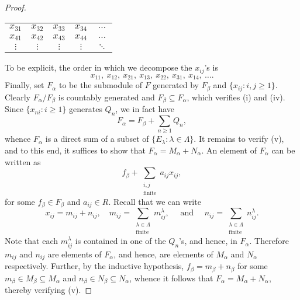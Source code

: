 \begin{proof}
\begin{center}
\begin{tabular}{ccccc}
            $x_{31}$ & $x_{32}$ & $x_{33}$ & $x_{34}$ & $\dots$\\
            $x_{41}$ & $x_{42}$ & $x_{43}$ & $x_{44}$ & $\dots$\\
            $\vdots$ & $\vdots$ & $\vdots$ & $\vdots$ & $\ddots$
        \end{tabular}
    \end{center}
    To be explicit, the order in which we decompose the $x_{ij}$'s is 
    \begin{equation*}
        x_{11},~ x_{12},~ x_{21},~ x_{13},~ x_{22},~ x_{31},~ x_{14},~\dots.
    \end{equation*}
    Finally, set $F_{\alpha}$ to be the submodule of $F$ generated by $F_\beta$ and $\{x_{ij}\colon i,j\ge 1\}$. Clearly $F_\alpha/F_\beta$ is countably generated and $F_\beta\subseteq F_\alpha$, which verifies (i) and (iv). Since $\{x_{ni}\colon i\ge 1\}$ generates $Q_n$, we in fact have
    \begin{equation*}
        F_\alpha = F_\beta + \sum_{n\ge 1} Q_n,
    \end{equation*}
    whence $F_\alpha$ is a direct sum of a subset of $\{E_\lambda\colon\lambda\in\Lambda\}$. It remains to verify (v), and to this end, it suffices to show that $F_\alpha = M_\alpha + N_\alpha$. An element of $F_\alpha$ can be written as 
    \begin{equation*}
        f_\beta + \sum_{\substack{i, j\\\text{finite}}} a_{ij}x_{ij},
    \end{equation*}
    for some $f_\beta\in F_\beta$ and $a_{ij}\in R$. Recall that we can write 
    \begin{equation*}
        x_{ij} = m_{ij} + n_{ij},\quad m_{ij} = \sum_{\substack{\lambda\in\Lambda\\\text{finite}}}m_{ij}^\lambda,\quad\text{ and }\quad n_{ij} = \sum_{\substack{\lambda\in\Lambda\\\text{finite}}} n_{ij}^\lambda.
    \end{equation*}
    Note that each $m_{ij}^\lambda$ is contained in one of the $Q_n$'s, and hence, in $F_\alpha$. Therefore $m_{ij}$ and $n_{ij}$ are elements of $F_{\alpha}$, and hence, are elements of $M_\alpha$ and $N_\alpha$ respectively. Further, by the inductive hypothesis, $f_\beta = m_\beta + n_\beta$ for some $m_\beta\in M_\beta\subseteq M_\alpha$ and $n_\beta\in N_\beta\subseteq N_\alpha$, whence it follows that $F_\alpha = M_\alpha + N_\alpha$, thereby verifying (v).


\end{proof}
